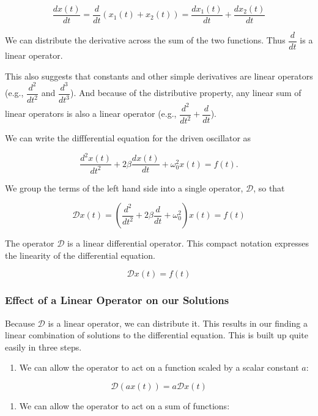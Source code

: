 \documentclass[11pt]{article}
\providecommand{\tightlist}{%
      \setlength{\itemsep}{0pt}\setlength{\parskip}{0pt}}
\begin{document}
\[\dfrac{dx(t)}{dt} = \dfrac{d}{dt} \left(x_1(t) + x_2(t)\right) = \dfrac{dx_1(t)}{dt} + \dfrac{dx_2(t)}{dt}\]

We can distribute the derivative across the sum of the two functions.
Thus \(\dfrac{d}{dt}\) is a linear operator.

This also suggests that constants and other simple derivatives are
linear operators (e.g., \(\dfrac{d^2}{dt^2}\) and
\(\dfrac{d^3}{dt^3}\)). And because of the distributive property, any
linear sum of linear operators is also a linear operator (e.g.,
\(\dfrac{d^2}{dt^2} + \dfrac{d}{dt}\)).

    We can write the diffferential equation for the driven oscillator as

\[\dfrac{d^2x(t)}{dt^2} + 2\beta \dfrac{dx(t)}{dt} + \omega_0^2 x(t) = f(t).\]

We group the terms of the left hand side into a single operator,
\(\mathcal{D}\), so that

\[\mathcal{D} x(t) = \left(\dfrac{d^2}{dt^2} + 2\beta \dfrac{d}{dt} + \omega_0^2\right) x(t) = f(t)\]

The operator \(\mathcal{D}\) is a linear differential operator. This
compact notation expresses the linearity of the differential equation.

\[\mathcal{D} x(t) = f(t)\]

    \subsubsection{Effect of a Linear Operator on our
Solutions}\label{effect-of-a-linear-operator-on-our-solutions}

Because \(\mathcal{D}\) is a linear operator, we can distribute it. This
results in our finding a linear combination of solutions to the
differential equation. This is built up quite easily in three steps.

\begin{enumerate}
\def\labelenumi{\arabic{enumi}.}
\tightlist
\item
  We can allow the operator to act on a function scaled by a scalar
  constant \(a\):
\end{enumerate}

\[\mathcal{D} \left(a x(t)\right) = a \mathcal{D} x(t)\]

\begin{enumerate}
\def\labelenumi{\arabic{enumi}.}
\setcounter{enumi}{1}
\tightlist
\item
  We can allow the operator to act on a sum of functions:
\end{enumerate}
\end{document}
